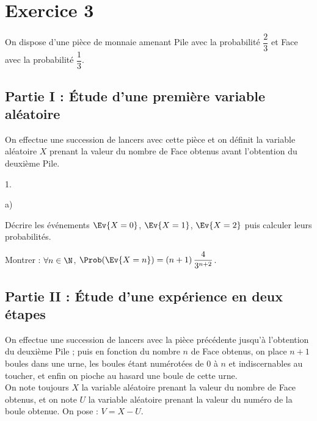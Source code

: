\documentclass[11pt]{article}%
\begin{document}
\section*{Exercice 3}

\noindent
On dispose d'une pièce de monnaie amenant Pile avec la probabilité 
$\dfrac{2}{3}$ et Face avec la probabilité $\dfrac{1}{3}$.

\subsection*{Partie I : Étude d'une première variable aléatoire}

\noindent
On effectue une succession de lancers avec cette pièce et on définit la 
variable aléatoire $X$ prenant la valeur du nombre de Face obtenus 
avant l'obtention du deuxième Pile.

\begin{noliste}{1.}
  \setlength{\itemsep}{4mm}
  \item 
  \begin{noliste}{a)}
    \setlength{\itemsep}{2mm}
    \item Décrire les événements $\Ev{X=0}$, $\Ev{X=1}$, $\Ev{X=2}$
    puis calculer leurs probabilités.
    
    

    
    \item Montrer : $\forall n \in \N$, $\Prob(\Ev{X=n}) = (n+1) \,
    \dfrac{4}{3^{n+2}}$.
    
    
  \end{noliste}
\end{noliste}



\subsection*{Partie II : Étude d'une expérience en deux étapes}

\noindent
On effectue une succession de lancers avec la pièce précédente jusqu'à 
l'obtention du deuxième Pile ; puis en fonction du nombre $n$ de Face 
obtenus, on place $n+1$ boules dans une urne, les boules étant 
numérotées de $0$ à $n$ et indiscernables au toucher, et enfin on 
pioche au hasard une boule de cette urne.\\[.1cm]
On note toujours $X$ la variable aléatoire prenant la valeur du nombre 
de Face obtenus, et on note $U$ la variable aléatoire prenant la valeur 
du numéro de la boule obtenue. On pose : $V=X-U$.
\end{document}
